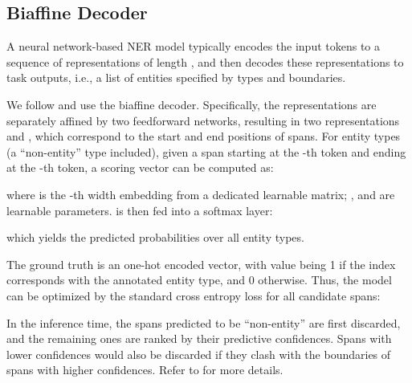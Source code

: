 \documentclass[11pt]{article}
\begin{document}
\subsection{Biaffine Decoder}
A neural network-based NER model typically encodes the input tokens to a sequence of representations  of length , and then decodes these representations to task outputs, i.e., a list of entities specified by types and boundaries. 

We follow \citet{yu-etal-2020-named} and use the biaffine decoder. Specifically, the representations  are separately affined by two feedforward networks, resulting in two representations  and , which correspond to the start and end positions of spans. For  entity types (a ``non-entity'' type included), given a span starting at the -th token and ending at the -th token, a scoring vector  can be computed as: 

where  is the -th width embedding from a dedicated learnable matrix; ,  and  are learnable parameters.  is then fed into a softmax layer: 

which yields the predicted probabilities over all entity types. 

The ground truth  is an one-hot encoded vector, with value being 1 if the index corresponds with the annotated entity type, and 0 otherwise. Thus, the model can be optimized by the standard cross entropy loss for all candidate spans: 


In the inference time, the spans predicted to be ``non-entity'' are first discarded, and the remaining ones are ranked by their predictive confidences. Spans with lower confidences would also be discarded if they clash with the boundaries of spans with higher confidences. Refer to \citet{yu-etal-2020-named} for more details. 
\end{document}
